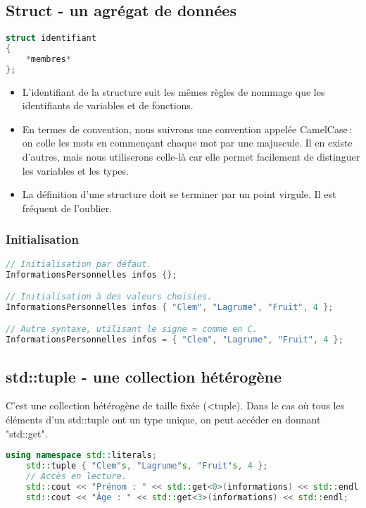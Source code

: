 \documentclass{article}
\begin{document}
\begin{itemize}
\subsection{Struct - un agrégat de données}
\begin{lstlisting}[language=C++]
struct identifiant
{
    *membres*
};
\end{lstlisting}{}
\begin{itemize}
    \item L’identifiant de la structure suit les mêmes règles de nommage que les identifiants de variables et de fonctions.
    \item En termes de convention, nous suivrons une convention appelée CamelCase : on colle les mots en commençant chaque mot par une majuscule. Il en existe d’autres, mais nous utiliserons celle-là car elle permet facilement de distinguer les variables et les types.
    \item La définition d’une structure doit se terminer par un point virgule. Il est fréquent de l’oublier.
\end{itemize}{}
\subsubsection{Initialisation}
\begin{lstlisting}[language=C++]
// Initialisation par défaut.
InformationsPersonnelles infos {};

// Initialisation à des valeurs choisies.
InformationsPersonnelles infos { "Clem", "Lagrume", "Fruit", 4 };

// Autre syntaxe, utilisant le signe = comme en C.
InformationsPersonnelles infos = { "Clem", "Lagrume", "Fruit", 4 };
\end{lstlisting}

\subsection{std::tuple - une collection hétérogène}
C'est une collection hétérogène de taille fixée (<tuple). Dans le cas où tous les éléments d'un std::tuple ont un type unique, on peut accéder en donnant "std::get".

\begin{lstlisting}[language=C++]
    using namespace std::literals;
    std::tuple { "Clem"s, "Lagrume"s, "Fruit"s, 4 };
    // Accès en lecture.
    std::cout << "Prénom : " << std::get<0>(informations) << std::endl;
    std::cout << "Âge : " << std::get<3>(informations) << std::endl;


\end{lstlisting}
\end{itemize}
\end{document}
